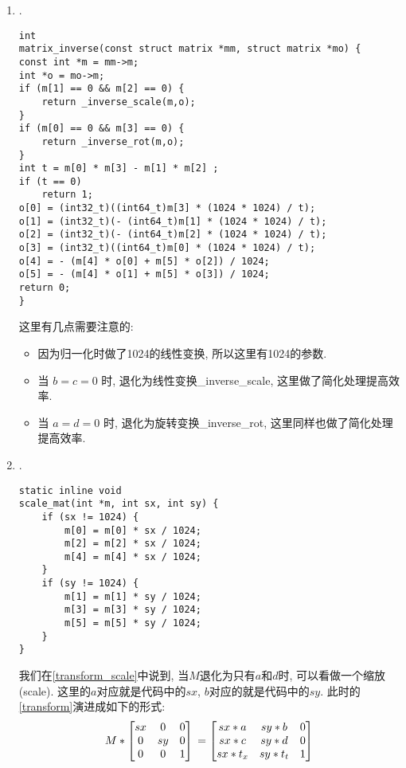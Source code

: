 {\begin {enumerate}
    \gaccobsplitinv

    \item { {}.
\begin{lstlisting}[language={[ANSI]C}]
int
matrix_inverse(const struct matrix *mm, struct matrix *mo) {
const int *m = mm->m;
int *o = mo->m;
if (m[1] == 0 && m[2] == 0) {
    return _inverse_scale(m,o);
}
if (m[0] == 0 && m[3] == 0) {
    return _inverse_rot(m,o);
}
int t = m[0] * m[3] - m[1] * m[2] ;
if (t == 0)
    return 1;
o[0] = (int32_t)((int64_t)m[3] * (1024 * 1024) / t);
o[1] = (int32_t)(- (int64_t)m[1] * (1024 * 1024) / t);
o[2] = (int32_t)(- (int64_t)m[2] * (1024 * 1024) / t);
o[3] = (int32_t)((int64_t)m[0] * (1024 * 1024) / t);
o[4] = - (m[4] * o[0] + m[5] * o[2]) / 1024;
o[5] = - (m[4] * o[1] + m[5] * o[3]) / 1024;
return 0;
}
\end{lstlisting}
        这里有几点需要注意的:
        \begin{itemize}
        \item { 因为归一化时做了1024的线性变换, 所以这里有1024的参数.}
        \item { 当 $b = c = 0$ 时, 退化为线性变换\_inverse\_scale, 这里做了简化处理提高效率. }
        \item { 当 $a = d = 0$ 时, 退化为旋转变换\_inverse\_rot, 这里同样也做了简化处理提高效率. }
        \end{itemize}
    }

    \gaccobsplitinv

    \item { {}.
\begin{lstlisting}[language={[ANSI]C}]
static inline void
scale_mat(int *m, int sx, int sy) {
    if (sx != 1024) {
        m[0] = m[0] * sx / 1024;
        m[2] = m[2] * sx / 1024;
        m[4] = m[4] * sx / 1024;
    }
    if (sy != 1024) {
        m[1] = m[1] * sy / 1024;
        m[3] = m[3] * sy / 1024;
        m[5] = m[5] * sy / 1024;
    }
}
\end{lstlisting}
        我们在\eqref{transform_scale}中说到, 当$M$退化为只有$a$和$d$时, 可以看做一个缩放(scale). 这里的$a$对应就是代码中的$sx$, $b$对应的就是代码中的$sy$. 此时的\eqref{transform}演进成如下的形式:
        \begin{equation}
            M *
            \begin{bmatrix}
                sx  &   0   &   0\\
                0   &   sy  &   0\\
                0   &   0   &   1
            \end{bmatrix}\\
            =
            \begin{bmatrix}
                sx*a    &   sy*b    &   0\\
                sx*c    &   sy*d    &   0\\
                sx*t_x  &   sy*t_t  &   1
            \end{bmatrix}\\
        \end{equation}
    }


\end{enumerate}}
